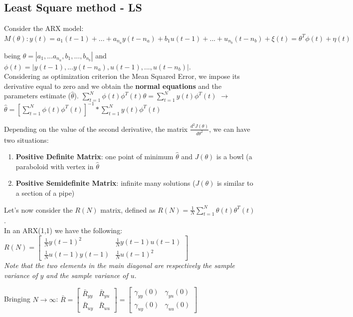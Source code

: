 \documentclass[10pt,a4paper]{article}
\begin{document}
\subsection{Least Square method - LS}
Consider the ARX model:
\center $M(\theta):y(t)=a_1(t-1)+...+a_{n_a}y(t-n_a)+b_1u(t-1)+...+u_{n_b}(t-n_b)+\xi(t)= \theta^T\phi(t)+\eta(t)$
\\ \raggedright \vspace{0.5em}
being $\theta = |a_1, ... a_{n_a}, b_1, ..., b_{n_b}|$ and 
$\phi(t)=|y(t-1), ... y(t-n_a), u(t-1), ..., u(t-n_b)|$. \\
Considering as optimization criterion the Mean Squared Error, we impose its derivative equal to zero and we obtain the \textbf{normal equations} and the parameters estimate ($\hat{\theta}$).
\center
	$\sum_{t=1}^N\phi(t)\phi^T(t)\theta = \sum_{t=1}^Ny(t)\phi^T(t)$ $\rightarrow$ $\hat{\theta}=[\sum_{t=1}^N\phi(t)\phi^T(t)]^{-1}*\sum_{t=1}^Ny(t)\phi^T(t)$ 
\\ \raggedright \vspace{0.5em}
Depending on the value of the second derivative, the matrix $\frac{d^2J(\theta)}{d\theta^2}$, we can have two situations:
\begin{enumerate}
	\item \textbf{Positive Definite Matrix}: one point of minimum $\hat{\theta}$ and $J(\theta)$ is a bowl (a paraboloid with vertex in $\hat{\theta}$
	\item \textbf{Positive Semidefinite Matrix}: infinite many solutions ($ J(\theta)$ is similar to a section of a pipe)
\end{enumerate}
Let's now consider the $R(N)$ matrix, defined as $R(N)=\frac{1}{N}\sum_{t=1}^N\theta(t)\theta^T(t)$. \\
In an ARX(1,1) we have the following:
\center
$R(N) = \begin{bmatrix}
\frac{1}{N}y(t-1)^2 & \frac{1}{N}y(t-1)u(t-1)\\
\frac{1}{N}u(t-1)y(t-1) & \frac{1}{N}u(t-1)^2
\end{bmatrix}$ \\ \vspace{0.3em}
\textit{Note that the two elements in the main diagonal are respectively the sample variance of $y$ and the sample variance of $u$}. \\
\raggedright
\pagebreak
Bringing $N \rightarrow \infty$:
$\bar{R}= \begin{bmatrix}
\bar{R}_{yy} & \bar{R}_{yu}\\
\bar{R}_{uy} & \bar{R}_{uu}
\end{bmatrix} = \begin{bmatrix}
\gamma_{yy}(0) & \gamma_{yu}(0)\\
\gamma_{uy}(0) & \gamma_{uu}(0)
\end{bmatrix}$ \\ \vspace{0.5em}
\end{document}
